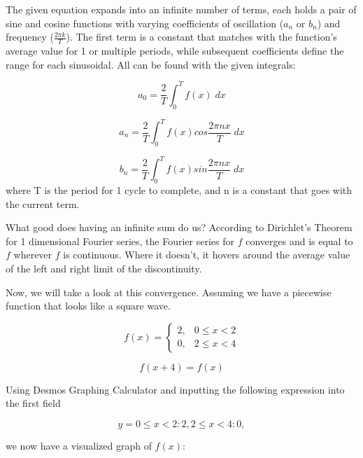 \documentclass[a4paper]{article}
\begin{document}
The given equation expands into an infinite number of terms, each holds a pair of sine and cosine functions with varying coefficients of oscillation ($a_n$ or $b_n$) and frequency ($\frac{2\pi k}{T}$). The first term is a constant that matches with the function's average value for 1 or multiple periods, while subsequent coefficients define the range for each sinusoidal. All can be found with the given integrals:

\begin{equation*}
	a_0 = \frac{2}{T} \int_{0}^{T}f(x)\;dx
\end{equation*}

\begin{equation*}
	a_n = \frac{2}{T} \int_{0}^{T}f(x)cos\frac{2\pi nx}{T}\;dx
\end{equation*}

\begin{equation*}
	b_n = \frac{2}{T} \int_{0}^{T}f(x)sin\frac{2\pi nx}{T}\;dx
\end{equation*}
where T is the period for 1 cycle to complete, and n is a constant that goes with the current term.

What good does having an infinite sum do us? According to Dirichlet's Theorem for 1 dimensional Fourier series, the Fourier series for $f$ converges and is equal to $f$ wherever $f$ is continuous. Where it doesn't, it hovers around the average value of the left and right limit of the discontinuity.

Now, we will take a look at this convergence. Assuming we have a piecewise function that looks like a square wave.

\begin{equation*}
	f(x) = \begin{cases} 2, & 0 \leq x < 2 \\ 0, & 2 \leq x < 4 \end{cases}
\end{equation*}

\begin{equation*}
	f(x+4) = f(x)
\end{equation*}

Using Desmos Graphing Calculator and inputting the following expression into the first field

\begin{equation*}
	y = {0\leq x<2:2,2\leq x<4:0},
\end{equation*}

we now have a visualized graph of $f(x)$:
\end{document}
